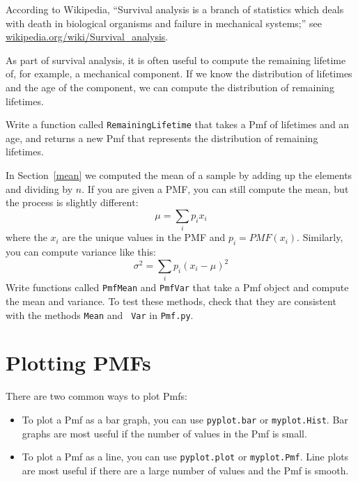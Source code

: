 \documentclass[12pt]{book}
\begin{document}
\begin{ex}

According to Wikipedia, ``Survival analysis is a branch of statistics
which deals with death in biological organisms and failure in
mechanical systems;'' see \url{wikipedia.org/wiki/Survival_analysis}.


As part of survival analysis, it is often useful to compute the
remaining lifetime of, for example, a mechanical component.  If we
know the distribution of lifetimes and the age of the component,
we can compute the distribution of remaining lifetimes.

Write a function called {\tt RemainingLifetime} that takes a
Pmf of lifetimes and an age, and returns a new Pmf that represents
the distribution of remaining lifetimes.

\end{ex}


\begin{ex}


In Section~\ref{mean} we computed the mean of a sample by adding up
the elements and dividing by $n$.  If you are given a PMF, you can
still compute the mean, but the process is slightly different:
%
\[ \mu = \sum_i p_i x_i \]
%
where the $x_i$ are the unique values in the PMF and $p_i = PMF(x_i)$.
Similarly, you can compute variance like this:
%
\[ \sigma^2 = \sum_i p_i (x_i - \mu)^2\]
% 
Write functions called {\tt PmfMean} and {\tt PmfVar} that take a
Pmf object and compute the mean and variance.  To test these methods,
check that they are consistent with the methods {\tt Mean} and {\tt
  Var} in {\tt Pmf.py}.

\end{ex}




\section{Plotting PMFs}


There are two common ways to plot Pmfs:

\begin{itemize}

\item To plot a Pmf as a bar graph, you can use {\tt pyplot.bar}
or {\tt myplot.Hist}.  Bar graphs are most useful if the number
of values in the Pmf is small.


\item To plot a Pmf as a line, you can use {\tt pyplot.plot}
or {\tt myplot.Pmf}.  Line plots are most useful if there are
a large number of values and the Pmf is smooth.


\end{itemize}
\end{document}
